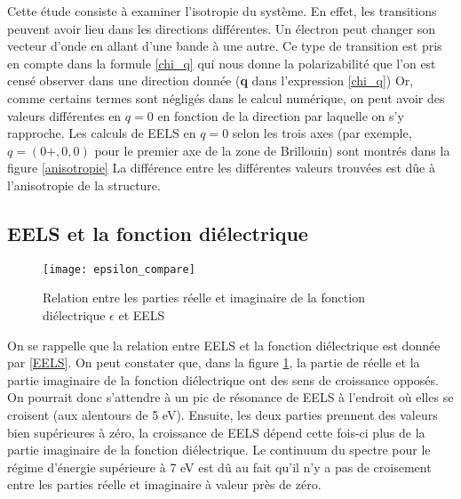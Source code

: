 Cette étude consiste à examiner l'isotropie du système. 
En effet, les transitions peuvent avoir lieu dans les directions différentes. 
Un électron peut changer son vecteur d'onde en allant d'une bande à une autre. 
Ce type de transition est pris en compte dans la formule \ref{chi_q} qui nous donne la polarizabilité que l'on est censé observer dans une direction donnée (\textbf{q} dans l'expression \ref{chi_q})
Or, comme certains termes sont négligés dans le calcul numérique, on peut avoir des valeurs différentes en $q = 0$ en fonction de la direction par laquelle on s'y rapproche.
Les calculs de EELS en $q = 0$ selon les trois axes (par exemple, $q=(0+,0,0)$ pour le premier axe de la zone de Brillouin) sont montrés dans la figure \ref{anisotropie}
La différence entre les différentes valeurs trouvées est dûe à l'anisotropie de la structure.  
\subsection{EELS et la fonction diélectrique}

\begin{figure}[!h]\label{epsilon_compare}
    \centering
    \texttt{[image: epsilon\_compare]}
    \caption{Relation entre les parties réelle et imaginaire de la fonction diélectrique $\epsilon$ et EELS}
\end{figure}

On se rappelle que la relation entre EELS et la fonction diélectrique est donnée par \ref{EELS}.
On peut constater que, dans la figure \ref{epsilon_compare}, la partie de réelle et la partie imaginaire de la fonction diélectrique ont des sens de croissance opposés. 
On pourrait donc s'attendre à un pic de résonance de EELS à l'endroit où elles se croisent (aux alentours de 5 eV).
Ensuite, les deux parties prennent des valeurs bien supérieures à zéro, la croissance de EELS dépend cette fois-ci plus de la partie imaginaire de la fonction diélectrique.
Le continuum du spectre pour le régime d'énergie supérieure à 7 eV est dû au fait qu'il n'y a pas de croisement entre les parties réelle et imaginaire à valeur près de zéro.

